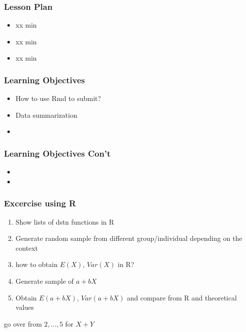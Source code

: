 

\begin{frame}
\frametitle{Lesson Plan}
\begin{itemize}
    \item xx min 
    \item xx min 
    \item xx min 
\end{itemize}
\end{frame}


\begin{frame}
\frametitle{Learning Objectives}

\begin{itemize}
    \item How to use Rmd to submit? 
    \item Data summarization  
    \item 
\end{itemize}
\end{frame}


\begin{frame}
    \frametitle{Learning Objectives Con't}

    \begin{itemize}
        \item 
        \item 

    \end{itemize}
\end{frame}


\begin{frame}
    \frametitle{Excercise using R}
    \begin{enumerate}
        \item Show lists of dstn functions in R
        \item Generate random sample from different group/individual depending on the context
        \item how to obtain $E(X)$, $Var(X)$ in R? 
        \item Generate sample of $a+bX$
        \item Obtain $E(a+bX)$, $Var(a+bX)$ and compare from R and theoretical values
    \end{enumerate}
    go over from $2, \dots, 5$ for $X+Y$
\end{frame}
